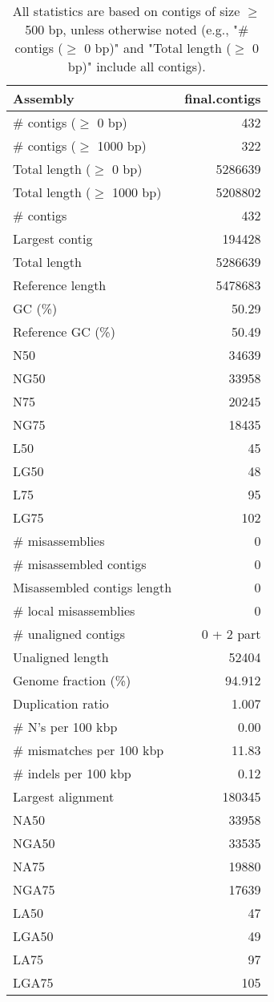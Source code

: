 \documentclass[12pt,a4paper]{article}
\begin{document}
\begin{table}[ht]
\begin{center}
\caption{All statistics are based on contigs of size $\geq$ 500 bp, unless otherwise noted (e.g., "\# contigs ($\geq$ 0 bp)" and "Total length ($\geq$ 0 bp)" include all contigs).}
\begin{tabular}{|l*{1}{|r}|}
\hline
Assembly & final.contigs \\ \hline
\# contigs ($\geq$ 0 bp) & 432 \\ \hline
\# contigs ($\geq$ 1000 bp) & 322 \\ \hline
Total length ($\geq$ 0 bp) & 5286639 \\ \hline
Total length ($\geq$ 1000 bp) & 5208802 \\ \hline
\# contigs & 432 \\ \hline
Largest contig & 194428 \\ \hline
Total length & 5286639 \\ \hline
Reference length & 5478683 \\ \hline
GC (\%) & 50.29 \\ \hline
Reference GC (\%) & 50.49 \\ \hline
N50 & 34639 \\ \hline
NG50 & 33958 \\ \hline
N75 & 20245 \\ \hline
NG75 & 18435 \\ \hline
L50 & 45 \\ \hline
LG50 & 48 \\ \hline
L75 & 95 \\ \hline
LG75 & 102 \\ \hline
\# misassemblies & 0 \\ \hline
\# misassembled contigs & 0 \\ \hline
Misassembled contigs length & 0 \\ \hline
\# local misassemblies & 0 \\ \hline
\# unaligned contigs & 0 + 2 part \\ \hline
Unaligned length & 52404 \\ \hline
Genome fraction (\%) & 94.912 \\ \hline
Duplication ratio & 1.007 \\ \hline
\# N's per 100 kbp & 0.00 \\ \hline
\# mismatches per 100 kbp & 11.83 \\ \hline
\# indels per 100 kbp & 0.12 \\ \hline
Largest alignment & 180345 \\ \hline
NA50 & 33958 \\ \hline
NGA50 & 33535 \\ \hline
NA75 & 19880 \\ \hline
NGA75 & 17639 \\ \hline
LA50 & 47 \\ \hline
LGA50 & 49 \\ \hline
LA75 & 97 \\ \hline
LGA75 & 105 \\ \hline
\end{tabular}
\end{center}
\end{table}
\end{document}
